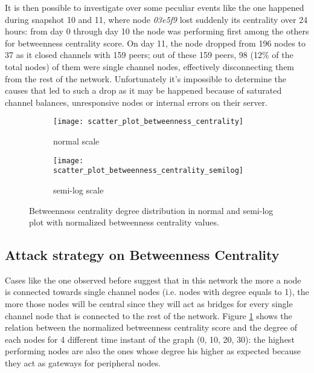	It is then possible to investigate over some peculiar events like the one happened during snapshot 10 and 11, where node \textit{03e5f9} lost suddenly its centrality over 24 hours: 
	from day 0 through day 10 the node was performing first among the others for betweenness centrality score. On day 11, the node dropped from 196 nodes to 37 as it closed channels with 159 peers; out of these 159 peers, 98 (12\% of the total nodes) of them were single channel nodes, effectively disconnecting them from the rest of the network. Unfortunately it's impossible to determine the causes that led to such a drop as it may be happened because of saturated channel balances, unresponsive nodes or internal errors on their server.
	
	\begin{figure}
		\centering
		\begin{subfigure}{0.8\textwidth}
			\centering
			\texttt{[image: scatter\_plot\_betweenness\_centrality]}
			\caption{normal scale}
		\end{subfigure}
		\begin{subfigure}{0.8\textwidth}
			\centering
			\texttt{[image: scatter\_plot\_betweenness\_centrality\_semilog]}
			\caption{semi-log scale}
		\end{subfigure}
		\caption{Betweenness centrality degree distribution in normal and semi-log plot with normalized betweenness centrality values. }
		\label{betweenness_centrality_degree}
	\end{figure}
	
	\subsection{Attack strategy on Betweenness Centrality}
	
	Cases like the one observed before suggest that in this network the more a node is connected towards single channel nodes (i.e. nodes with degree equals to 1), the more those nodes will be central since they will act as bridges for every single channel node that is connected to the rest of the network. Figure \ref{betweenness_centrality_degree} shows the relation between the normalized betweenness centrality score and the degree of each nodes for 4 different time instant of the graph (0, 10, 20, 30): the highest performing nodes are also the ones whose degree his higher as expected because they act as gateways for peripheral nodes. 
	
